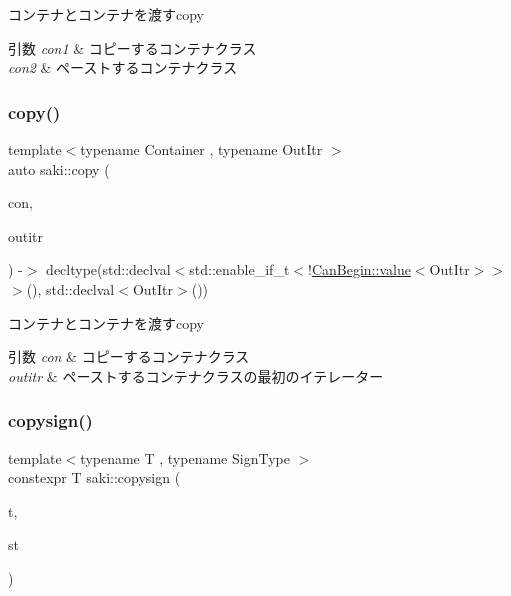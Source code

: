 コンテナとコンテナを渡すcopy 


\begin{DoxyParams}{引数}
{\em con1} & コピーするコンテナクラス \\
\hline
{\em con2} & ペーストするコンテナクラス \\
\hline
\end{DoxyParams}
\mbox{\label{namespacesaki_ac0e54eca8b5a57e75bad41d199756ce2}} 
\subsubsection{\texorpdfstring{copy()}{copy()}\hspace{0.1cm}{\footnotesize\ttfamily [2/2]}}
{\footnotesize\ttfamily template$<$typename Container , typename Out\+Itr $>$ \\
auto saki\+::copy (\begin{DoxyParamCaption}\item[{Container \&\&}]{con,  }\item[{Out\+Itr}]{outitr }\end{DoxyParamCaption}) -\/$>$ decltype(std\+::declval$<$std\+::enable\+\_\+if\+\_\+t$<$!\mbox{\hyperlink{structsaki_1_1_can_begin_abd4e5cbf549dbd55bc2421476a94b505}{Can\+Begin\+::value}}$<$Out\+Itr$>$$>$$>$(), std\+::declval$<$Out\+Itr$>$())
	}



コンテナとコンテナを渡すcopy 


\begin{DoxyParams}{引数}
{\em con} & コピーするコンテナクラス \\
\hline
{\em outitr} & ペーストするコンテナクラスの最初のイテレーター \\
\hline
\end{DoxyParams}
\mbox{\label{namespacesaki_a1791113a346dea4c2d7fd8e120016038}} 
\subsubsection{\texorpdfstring{copysign()}{copysign()}}
{\footnotesize\ttfamily template$<$typename T , typename Sign\+Type $>$ \\
constexpr T saki\+::copysign (\begin{DoxyParamCaption}\item[{const T \&}]{t,  }\item[{const Sign\+Type \&}]{st }\end{DoxyParamCaption})}



